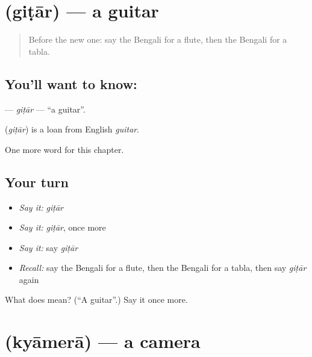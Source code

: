 \section[\texorpdfstring{\bn{গিটার} (giṭār)}{গিটার (giṭār)}]{ (giṭār) — a guitar}

\label{lesson:BN-C131-gitar}



\begin{quote}
Before the new one: say the Bengali for a flute, then the Bengali for a tabla.
\end{quote}

\subsection*{You'll want to know: }
\textbf{} — \emph{giṭār} — \textquotedblleft{}a guitar\textquotedblright{}.

\begin{cousinweb}
\textbf{} (\emph{giṭār}) is a loan from English \emph{guitar}.
\end{cousinweb}

\begin{grammarlens}[title={What you've built}]
One more word for this chapter.
\end{grammarlens}

\subsection*{Your turn}
\begin{itemize}
\raggedright
  \item \emph{Say it:} \emph{giṭār}
  \item \emph{Say it:} \emph{giṭār}, once more
  \item \emph{Say it:} say \emph{giṭār}
  \item \emph{Recall:} say the Bengali for a flute, then the Bengali for a tabla, then say \emph{giṭār} again
\end{itemize}

\begin{tcolorbox}[breakable,colback=teal!4,colframe=teal!35!black,title={Before you move on}]
What does  mean? (\textquotedblleft{}A guitar\textquotedblright{}.) Say it once more.
\end{tcolorbox}
\section[\texorpdfstring{\bn{ক্যামেরা} (kyāmerā)}{ক্যামেরা (kyāmerā)}]{ (kyāmerā) — a camera}


